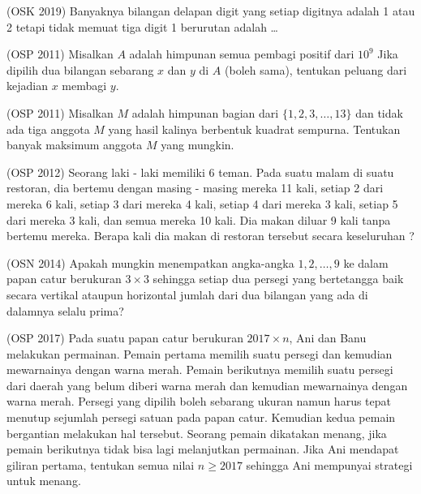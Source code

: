 \documentclass[12pt]{scrartcl}
\begin{document}
	\begin{soalbaru} (OSK 2019)
	Banyaknya bilangan delapan digit yang setiap digitnya adalah 1 atau 2 tetapi tidak
memuat tiga digit 1 berurutan adalah \dots
	\end{soalbaru}
	
	\begin{soalbaru}
	(OSP 2011) Misalkan $A$ adalah himpunan semua pembagi positif dari $10^9$ Jika dipilih dua bilangan sebarang $x$ dan $y$ di $A$ (boleh sama), tentukan peluang dari kejadian $x$
	membagi $y$.
	\end{soalbaru} 
	
	\begin{soalbaru}
	 (OSP 2011) Misalkan $M$ adalah himpunan bagian dari $\{1,2,3,\dots,13\}$ dan tidak ada tiga	anggota $M$ yang hasil kalinya berbentuk kuadrat sempurna. Tentukan banyak maksimum anggota $M$ yang mungkin.
	\end{soalbaru}
	
	\begin{soalbaru}
	(OSP 2012) Seorang laki - laki memiliki 6 teman. Pada suatu malam di suatu restoran, dia bertemu
	dengan masing - masing mereka 11 kali, setiap 2 dari mereka 6 kali, setiap 3 dari mereka 4 kali,
	setiap 4 dari mereka 3 kali, setiap 5 dari mereka 3 kali, dan semua mereka 10 kali. Dia makan diluar
	9 kali tanpa bertemu mereka. Berapa kali dia makan di restoran tersebut secara keseluruhan ?
	\end{soalbaru} 
	
	\begin{soalbaru}
	(OSN 2014) Apakah mungkin menempatkan angka-angka $1,2,\dots,9$ ke dalam papan catur berukuran $3\times 3$ sehingga setiap dua persegi yang bertetangga baik secara vertikal ataupun horizontal jumlah dari dua bilangan yang
	ada di dalamnya selalu prima?
	\end{soalbaru} 
	
	\begin{soalbaru}
	(OSP 2017) Pada suatu papan catur berukuran $2017 \times n$, Ani dan Banu melakukan permainan. Pemain
	pertama memilih suatu persegi dan kemudian mewarnainya dengan warna merah. Pemain
	berikutnya memilih suatu persegi dari daerah yang belum diberi warna merah dan kemudian
	mewarnainya dengan warna merah. Persegi yang dipilih boleh sebarang ukuran namun harus
	tepat menutup sejumlah persegi satuan pada papan catur. Kemudian kedua pemain bergantian
	melakukan hal tersebut. Seorang pemain dikatakan menang, jika pemain berikutnya tidak
	bisa lagi melanjutkan permainan. Jika Ani mendapat giliran pertama, tentukan semua nilai
	$n \ge 2017$ sehingga Ani mempunyai strategi untuk menang.
	\end{soalbaru} 
	
\end{document}
